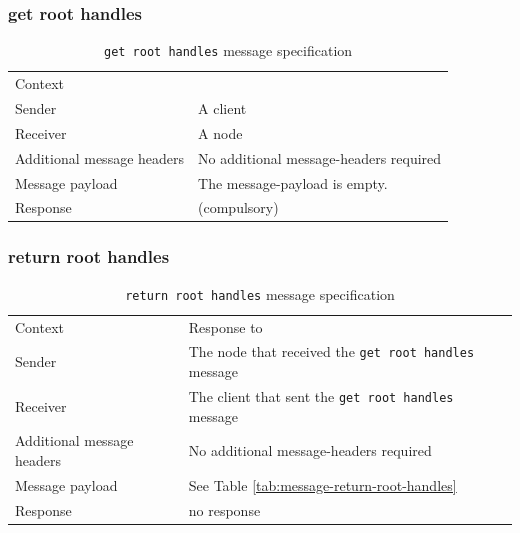\subsubsection{get root handles}\label{sec:get-root-handles}
\begin{table}[H]
    \begin{tabu}{lX}
        Context
        &  \\
        
        Sender
        & A \gls{client} \\
        
        Receiver
        & A \gls{node} \\
        
        Additional message headers
        &  No additional \glspl{message-header} required \\
        
        Message payload
        & The \gls{message-payload} is empty. \\

        Response
        &  (compulsory) \\
    \end{tabu}
    \caption{\texttt{get root handles} message specification}
\end{table}

\subsubsection{return root handles}\label{sec:return-root-handles}
\begin{table}[H]
    \begin{tabu}{lX}
        Context
        & Response to  \\
        
        Sender
        & The \gls{node} that received the \texttt{get root handles} message \\
        
        Receiver
        & The \gls{client} that sent the \texttt{get root handles} message \\
        
        Additional message headers
        &  No additional \glspl{message-header} required \\
        
        Message payload
        & See Table \ref{tab:message-return-root-handles}\\

        Response
        & no response \\
    \end{tabu}
    \caption{\texttt{return root handles} message specification}
\end{table}

